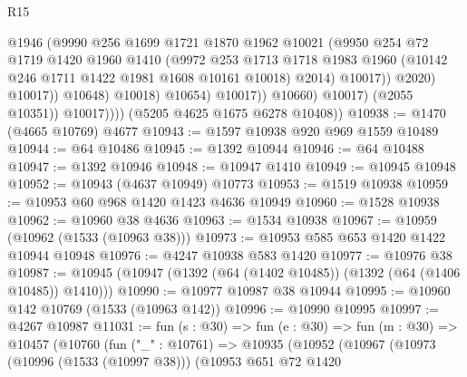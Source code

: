\begin{lexlean}{R15}
\begin{coremodule}
                                    @1946
                                    (@9990
                                      @256
                                      @1699
                                      @1721
                                      @1870
                                      @1962
                                      @10021
                                      (@9950
                                        @254
                                        @72
                                        @1719
                                        @1420
                                        @1960
                                        @1410
                                        (@9972
                                          @253
                                          @1713
                                          @1718
                                          @1983
                                          @1960
                                          (@10142 @246 @1711 @1422 @1981 @1608 @10161 @10018)
                                          @2014)
                                        @10017))
                                    @2020)
                                  @10017))
                              @10648)
                            @10018)
                          @10654)
                        @10017))
                    @10660)
                  @10017)
                (@2055 @10351))
              @10017))))
      (@5205 @4625 @1675 @6278 @10408))
@10938 := @1470 (@4665 @10769) @4677
@10943 := @1597 @10938 @920 @969 @1559 @10489
@10944 := @64 @10486
@10945 := @1392 @10944
@10946 := @64 @10488
@10947 := @1392 @10946
@10948 := @10947 @1410
@10949 := @10945 @10948
@10952 := @10943 (@4637 @10949) @10773
@10953 := @1519 @10938
@10959 := @10953 @60 @968 @1420 @1423 @4636 @10949
@10960 := @1528 @10938
@10962 := @10960 @38 @4636
@10963 := @1534 @10938
@10967 := @10959 (@10962 (@1533 (@10963 @38)))
@10973 := @10953 @585 @653 @1420 @1422 @10944 @10948
@10976 := @4247 @10938 @583 @1420
@10977 := @10976 @38
@10987 := @10945 (@10947 (@1392 (@64 (@1402 @10485)) (@1392 (@64 (@1406 @10485)) @1410)))
@10990 := @10977 @10987 @38 @10944
@10995 := @10960 @142 @10769 (@1533 (@10963 @142))
@10996 := @10990 @10995
@10997 := @4267 @10987
@11031 := fun (s : @30) =>
  fun (e : @30) =>
  fun (m : @30) =>
  @10457
    (@10760
      (fun ("_" : @10761) =>
      @10935
        (@10952
          (@10967
            (@10973
              (@10996 (@1533 (@10997 @38)))
              (@10953
                @651
                @72
                @1420

\end{coremodule}
\end{lexlean}
